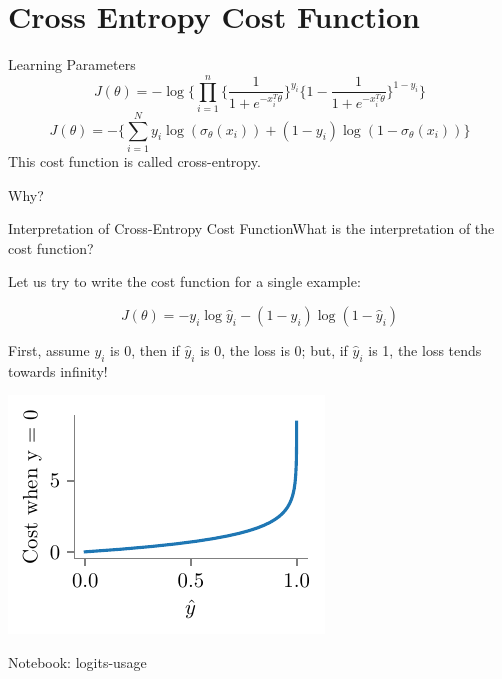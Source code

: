 \documentclass{beamer}
\begin{document}
\section{Cross Entropy Cost Function}
\begin{frame}{Learning Parameters}
\[
J(\theta) = -\log \bigg\{\prod_{i=1}^{n} \Big\{\frac{1}{1 + e^{-x_{i}^T\theta}}\Big\}^{y_{i}}\Big\{1 - \frac{1}{1 + e^{-x_{i}^T\theta}}\Big\}^{1 - y_{i}}\bigg\}
\]
\[
J(\theta) = -\bigg\{\sum_{i=1}^{N} y_{i} \log(\sigma_{\theta}(x_{i})) + (1 - y_{i})\log(1 - \sigma_{\theta}(x_{i}))\bigg\}
\]
\pause This cost function is called cross-entropy.

\pause Why?
\end{frame}

\begin{frame}{Interpretation of Cross-Entropy Cost Function}\pause What is the interpretation of the cost function?

\pause Let us try to write the cost function for a single example:

\pause $$J(\theta) = -y_i\log{\hat{y}_i} - (1-y_i)\log({1-\hat{y}_i})$$

\pause First, assume $y_i$ is 0, then if $\hat{y}_i$ is 0, the loss is 0; but, if $\hat{y}_i$ is 1, the loss tends towards infinity!

	\includegraphics[scale=0.7]{../assets/logistic-regression/figures/logistic-cross-cost-0}


\end{frame}

\begin{frame}
	Notebook: logits-usage
\end{frame}
\end{document}
